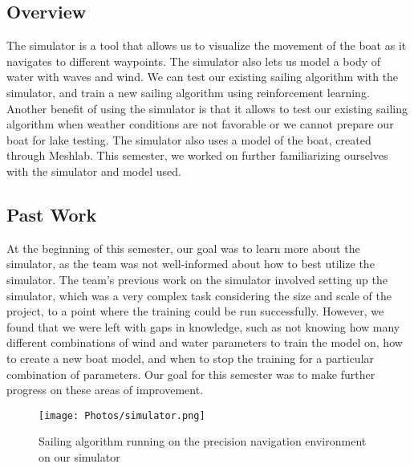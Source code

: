 \documentclass{article}
\begin{document}
\subsection{Overview}
The simulator is a tool that allows us to visualize the movement of the boat as it navigates to different waypoints. The simulator also lets us model a body of water with waves and wind. We can test our existing sailing algorithm with the simulator, and train a new sailing algorithm using reinforcement learning. Another benefit of using the simulator is that it allows to test our existing sailing algorithm when weather conditions are not favorable or we cannot prepare our boat for lake testing. The simulator also uses a model of the boat, created through Meshlab. This semester, we worked on further familiarizing ourselves with the simulator and model used.
\subsection{Past Work}
At the beginning of this semester, our goal was to learn more about the simulator, as the team was not well-informed about how to best utilize the simulator. The team's previous work on the simulator involved setting up the simulator, which was a very complex task considering the size and scale of the project, to a point where the training could be run successfully. However, we found that we were left with gaps in knowledge, such as not knowing how many different combinations of wind and water parameters to train the model on, how to create a new boat model, and when to stop the training for a particular combination of parameters. Our goal for this semester was to make further progress on these areas of improvement. 
\begin{figure}[htp]
    \centering
    \texttt{[image: Photos/simulator.png]}
    \caption{Sailing algorithm running on the precision navigation environment on our simulator}
    \label{Photos/fig:simulator.png}
\end{figure}
\end{document}
